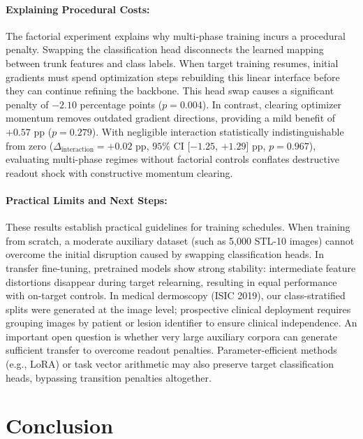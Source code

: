 \documentclass[10pt]{article}
\begin{document}
\paragraph{Explaining Procedural Costs:}
The factorial experiment explains why multi-phase training incurs a procedural penalty. Swapping the classification head disconnects the learned mapping between trunk features and class labels. When target training resumes, initial gradients must spend optimization steps rebuilding this linear interface before they can continue refining the backbone. This head swap causes a significant penalty of $-2.10$ percentage points ($p = 0.004$). In contrast, clearing optimizer momentum removes outdated gradient directions, providing a mild benefit of $+0.57$ pp ($p = 0.279$). With negligible interaction statistically indistinguishable from zero ($\Delta_{\mathrm{interaction}} = +0.02$ pp, $95\%$ CI [$-1.25$, $+1.29$] pp, $p = 0.967$), evaluating multi-phase regimes without factorial controls conflates destructive readout shock with constructive momentum clearing.

\paragraph{Practical Limits and Next Steps:}
These results establish practical guidelines for training schedules. When training from scratch, a moderate auxiliary dataset (such as 5,000 STL-10 images) cannot overcome the initial disruption caused by swapping classification heads. In transfer fine-tuning, pretrained models show strong stability: intermediate feature distortions disappear during target relearning, resulting in equal performance with on-target controls. In medical dermoscopy (ISIC 2019), our class-stratified splits were generated at the image level; prospective clinical deployment requires grouping images by patient or lesion identifier to ensure clinical independence. An important open question is whether very large auxiliary corpora can generate sufficient transfer to overcome readout penalties. Parameter-efficient methods (e.g., LoRA) or task vector arithmetic \cite{ilharco2023task,ostapenko2022continual} may also preserve target classification heads, bypassing transition penalties altogether.

\section{Conclusion}\label{sec:conclusion}
\end{document}
